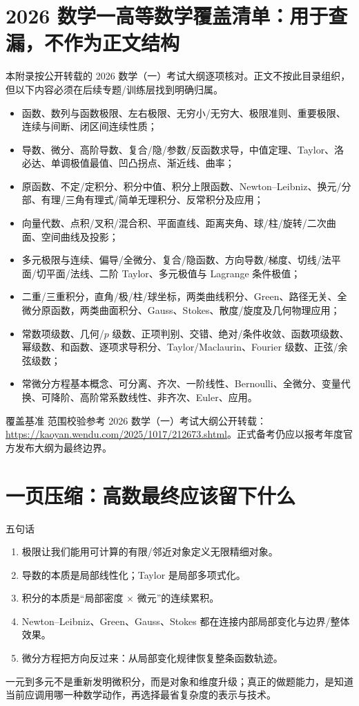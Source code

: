 \documentclass[11pt,a4paper,openany]{ctexbook}
\begin{document}
\chapter{2026 数学一高等数学覆盖清单：用于查漏，不作为正文结构}
本附录按公开转载的 2026 数学（一）考试大纲逐项核对。正文不按此目录组织，但以下内容必须在后续专题/训练层找到明确归属。
\begin{itemize}
\item 函数、数列与函数极限、左右极限、无穷小/无穷大、极限准则、重要极限、连续与间断、闭区间连续性质；
\item 导数、微分、高阶导数、复合/隐/参数/反函数求导，中值定理、Taylor、洛必达、单调极值最值、凹凸拐点、渐近线、曲率；
\item 原函数、不定/定积分、积分中值、积分上限函数、Newton--Leibniz、换元/分部、有理/三角有理式/简单无理积分、反常积分及应用；
\item 向量代数、点积/叉积/混合积、平面直线、距离夹角、球/柱/旋转/二次曲面、空间曲线及投影；
\item 多元极限与连续、偏导/全微分、复合/隐函数、方向导数/梯度、切线/法平面/切平面/法线、二阶 Taylor、多元极值与 Lagrange 条件极值；
\item 二重/三重积分，直角/极/柱/球坐标，两类曲线积分、Green、路径无关、全微分原函数，两类曲面积分、Gauss、Stokes、散度/旋度及几何物理应用；
\item 常数项级数、几何/$p$ 级数、正项判别、交错、绝对/条件收敛、函数项级数、幂级数、和函数、逐项求导积分、Taylor/Maclaurin、Fourier 级数、正弦/余弦级数；
\item 常微分方程基本概念、可分离、齐次、一阶线性、Bernoulli、全微分、变量代换、可降阶、高阶常系数线性、非齐次、Euler、应用。
\end{itemize}
\begin{methodbox}{覆盖基准}
范围校验参考 2026 数学（一）考试大纲公开转载：\url{https://kaoyan.wendu.com/2025/1017/212673.shtml}。正式备考仍应以报考年度官方发布大纲为最终边界。
\end{methodbox}

\chapter{一页压缩：高数最终应该留下什么}
\begin{corebox}{五句话}
\begin{enumerate}
\item 极限让我们能用可计算的有限/邻近对象定义无限精细对象。
\item 导数的本质是局部线性化；Taylor 是局部多项式化。
\item 积分的本质是“局部密度 $\times$ 微元”的连续累积。
\item Newton--Leibniz、Green、Gauss、Stokes 都在连接内部局部变化与边界/整体效果。
\item 微分方程把方向反过来：从局部变化规律恢复整条函数轨迹。
\end{enumerate}
一元到多元不是重新发明微积分，而是对象和维度升级；真正的做题能力，是知道当前应调用哪一种数学动作，再选择最省复杂度的表示与技术。
\end{corebox}
\end{document}
